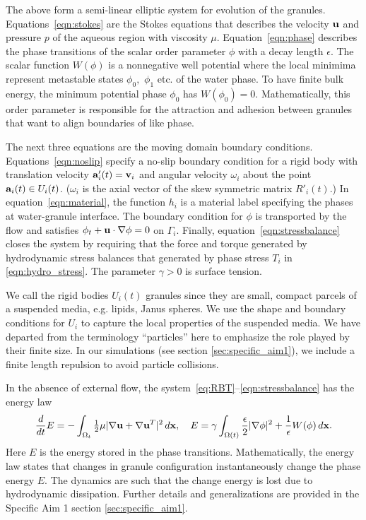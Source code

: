 The above form a semi-linear elliptic 
system for evolution of the granules.  Equations~\eqref{eqn:stokes} are the
Stokes equations that describes the velocity $\uu$ and pressure $p$ of
the aqueous region with viscosity $\mu$.  Equation~\eqref{eqn:phase} describes the
phase transitions of the scalar order parameter $\phi$ with a decay
length $\epsilon$.
The scalar function $W(\phi)$ is a nonnegative
well potential where the local 
minimima represent metastable states $\phi_0,$ $\phi_1$ etc. of the water phase.
To have finite bulk energy, the minimum potential phase
$\phi_0$ has $W(\phi_0) = 0.$
Mathematically, this order parameter is responsible for
the attraction and adhesion between granules that want to align boundaries
of like phase.

The next three equations are the moving domain boundary conditions.
Equations~\eqref{eqn:noslip} specify a no-slip
boundary condition for a rigid body with translation velocity $\aa'_i(t) = \vv_i$
and angular velocity $\omega_i$
about the point $\aa_i(t) \in U_i(t)$.
($\omega_i$ is the axial vector of the
skew symmetric matrix $R'_i(t)$.)
In
equation~\eqref{eqn:material}, the function $h_i$ is a material label
specifying the phases at water-granule interface.
The boundary condition for $\phi$ is transported by the flow
and satisfies $\phi_t + \uu \cdot \nabla \phi = 0$ on $\Gamma_i$.
Finally,
equation~\eqref{eqn:stressbalance} closes the system by
requiring that the force and torque generated by 
hydrodynamic stress balances that generated by phase stress $T_i$ in
\eqref{eqn:hydro_stress}.
The parameter $\gamma > 0$ is surface tension. 

We call the rigid bodies $U_i(t)$ granules since they are small, compact
parcels of a suspended media, e.g. lipids, Janus spheres.
We use the shape and boundary conditions for $U_i$ to capture the local
properties of the suspended media. 
We have departed from the terminology ``particles'' here
to emphasize the role played by their finite size. 
In our simulations (see section \ref{sec:specific_aim1}),
we include a finite length repulsion to avoid particle
collisions.

In the absence of external flow,
the system~\eqref{eq:RBT}--\eqref{eqn:stressbalance}
has the energy law
\begin{equation}
\label{eq:energy_law}
  \frac{d}{dt}E
  = - \int_{\Omega_t}\tfrac{1}{2}\mu|\nabla \uu + \nabla
  \uu^T|^2 \,d\xx,\quad
    E = \gamma \int_{\Omega(t)}
  \frac{\epsilon}{2} |\nabla \phi|^2 + \frac{1}{\epsilon} W(\phi) \,d\xx.
\end{equation}
Here $E$ is the energy stored in the phase transitions.
Mathematically, the energy law states that changes
in granule configuration instantaneously change the phase energy $E$.
The dynamics are such that the change energy
is lost due to hydrodynamic dissipation.
Further details and generalizations are provided in
the Specific Aim 1 section \ref{sec:specific_aim1}.

